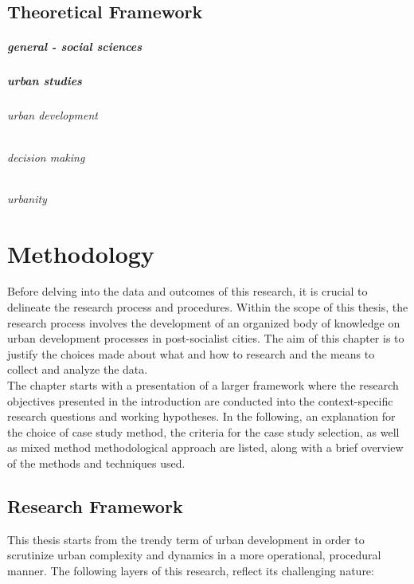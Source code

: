 \documentclass[11pt]{report}
\begin{document}
\section{Theoretical Framework}


\paragraph{general - social sciences}

\paragraph{urban studies}

\subparagraph{urban development}

\subparagraph{decision making}

\subparagraph{urbanity}



\chapter{Methodology}

Before delving into the data  and outcomes of this research, it is crucial to delineate the research process and procedures. Within the scope of this thesis, the research process involves the development of an organized body of knowledge on urban development processes in post-socialist cities. The aim of this chapter is to justify the choices made about what and how to research and the means to collect and analyze the data.
\\
The chapter starts with a presentation of a larger framework where the research objectives presented in the introduction are conducted into the context-specific research questions and working hypotheses. In the following, an explanation for the choice of case study method, the criteria for the case study selection, as well as mixed method methodological approach are listed, along with a brief overview of the methods and techniques used.  

\section{Research Framework}

This thesis starts from the trendy term of urban development in order to scrutinize urban complexity and dynamics in a more operational, procedural manner. The following layers of this research, reflect its challenging nature:
\end{document}
